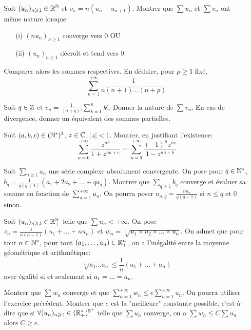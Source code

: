 \begin{exercise}
	Soit $(u_{n})_{n\geqslant1}\in\mathbb{R}^{\mathbb{N}}$ et $v_{n}=n(u_{n}-u_{n+1})$. Montrer
	que $\sum u_{n}$ et $\sum v_{n}$ ont même nature lorsque
	\begin{enumerate}
		\item
		[(i)] $(nu_{n})_{n\geqslant1}$ converge vers 0 OU
		\item
		[(ii)] $(u_{n})_{n\geqslant 1}$ décroît et tend vers 0.
	\end{enumerate}
	Comparer alors les sommes respectives. En déduire, pour $p\geqslant1$ fixé,
	$$\sum_{n=1}^{+\infty}\frac{1}{n(n+1)\dots(n+p)}$$
\end{exercise}

\begin{exercise}
	Soit $q\in\mathbb{Z}$ et $v_{n}=\frac{1}{(n+q)!}\sum_{k=1}^{n}k!$. Donner la nature de
	$\sum v_{n}$. En cas de divergence, donner un équivalent des sommes
	partielles.
\end{exercise}

\begin{exercise}
	Soit $(a,b,c)\in (\mathbb{N}^{*})^{3}$, $z\in\mathbb{C}$, $\vert z\vert<1$. Montrer, en
	justifiant l'existence:
	$$\sum_{n=0}^{+\infty}\frac{z^{nb}}{1+z^{na+c}}=\sum_{n=0}^{+\infty}\frac{(-1)^{n}z^{nc}}{1-z^{na+b}}$$
\end{exercise}

\begin{exercise}
	Soit $\sum_{n\geqslant1} a_{n}$ une série complexe absolument convergente. On
	pose pour $q\in\mathbb{N}^{*}$, $b_q=\frac{1}{q(q+1)}(a_{1}+2a_{2}+\dots+qa_{q})$.
	Montrer que $\sum_{q\geqslant1}b_{q}$ converge et évaluer sa somme en fonction
	de $\sum_{n=1}^{+\infty}a_{n}$. On pourra poser
	$u_{n,q}=\frac{na_{n}}{q(q+1)}$ si $n\leqslant q$ et 0 sinon.
\end{exercise}

\begin{exercise}
	Soit $(u_{n})_{n\geqslant1}\in\mathbb{R}_{+}^{\mathbb{N}}$ telle que $\sum u_{n}<+\infty$. On
	pose $v_{n}=\frac{1}{n(n+1)}(u_{1}+\dots+nu_{n})$ et $w_{n}=\sqrt[n]{u_1\times
	u_2\times\dots\times u_n}$. On admet que pour tout $n\in\mathbb{N}^{*}$, pour tout
	$(a_{1},\dots,a_{n})\in\mathbb{R}_{+}^{n}$, on a l'inégalité entre la moyenne
	géométrique et arithmétique:
	$$\sqrt[n]{a_{1}\dots a_{n}}\leqslant\frac{1}{n}(a_{1}+\dots+a_{n})$$ avec
	égalité si et seulement si $a_{1}=\dots=a_{n}$.

	Montrer que $\sum w_{n}$ converge et que $\sum_{n=1}^{+\infty}w_{n}\leqslant
	e\sum_{n=1}^{+\infty}u_{n}$. On pourra utiliser l'exercice précédent. Montrer
	que $e$ est la "meilleure" constante possible, c'est-à-dire que si $\forall
	(u_{n})_{n\geqslant1}\in(\mathbb{R}_{+}^{*})^{\mathbb{N}^{*}}$ telle que $\sum u_{n}$
	converge, on a $\sum w_{n}\leqslant C\sum u_{n}$ alors $C\geqslant e$.
\end{exercise}


